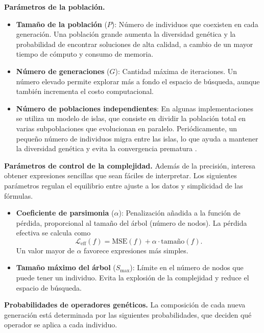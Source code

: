 \medskip \noindent\textbf{Parámetros de la población.}
\begin{itemize}
    \item \textbf{Tamaño de la población} (\(P\)): Número de individuos que coexisten en cada generación. Una población grande aumenta la diversidad genética y la probabilidad de encontrar soluciones de alta calidad, a cambio de un mayor tiempo de cómputo y consumo de memoria.

    \item \textbf{Número de generaciones} (\(G\)): Cantidad máxima de iteraciones. Un número elevado permite explorar más a fondo el espacio de búsqueda, aunque también incrementa el costo computacional.

    \item \textbf{Número de poblaciones independientes}: En algunas implementaciones se utiliza un modelo de islas, que consiste en dividir la población total en varias subpoblaciones que evolucionan en paralelo. Periódicamente, un pequeño número de individuos migra entre las islas, lo que ayuda a mantener la diversidad genética y evita la convergencia prematura \cite{whitley1990island}.
\end{itemize}

\medskip \noindent\textbf{Parámetros de control de la complejidad.} Además de la precisión, interesa obtener expresiones sencillas que sean fáciles de interpretar. Los siguientes parámetros regulan el equilibrio entre ajuste a los datos y simplicidad de las fórmulas.

\begin{itemize}
    \item \textbf{Coeficiente de parsimonia} (\(\alpha\)): Penalización añadida a la función de pérdida, proporcional al tamaño del árbol (número de nodos). La pérdida efectiva se calcula como
          \[
          \mathcal{L}_{\text{eff}}(f) = \text{MSE}(f) + \alpha \cdot \text{tamaño}(f).
          \]
          Un valor mayor de \(\alpha\) favorece expresiones más simples.

    \item \textbf{Tamaño máximo del árbol} (\(S_{\max}\)): Límite en el número de nodos que puede tener un individuo. Evita la explosión de la complejidad y reduce el espacio de búsqueda.
\end{itemize}

\medskip \noindent\textbf{Probabilidades de operadores genéticos.} La composición de cada nueva generación está determinada por las siguientes probabilidades, que deciden qué operador se aplica a cada individuo.

